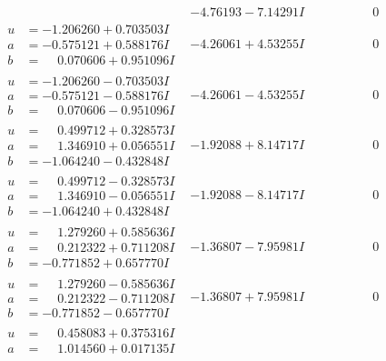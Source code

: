 \documentclass[1p]{elsarticle_modified}
\theoremstyle{definition}
\begin{document}
$$\begin{array}{c|c|c}
 & -4.76193 - 7.14291 I & \phantom{-0.000000 } 0 \\ \hline\begin{aligned}
u &= -1.206260 + 0.703503 I \\
a &= -0.575121 + 0.588176 I \\
b &= \phantom{-}0.070606 + 0.951096 I\end{aligned}
 & -4.26061 + 4.53255 I & \phantom{-0.000000 } 0 \\ \hline\begin{aligned}
u &= -1.206260 - 0.703503 I \\
a &= -0.575121 - 0.588176 I \\
b &= \phantom{-}0.070606 - 0.951096 I\end{aligned}
 & -4.26061 - 4.53255 I & \phantom{-0.000000 } 0 \\ \hline\begin{aligned}
u &= \phantom{-}0.499712 + 0.328573 I \\
a &= \phantom{-}1.346910 + 0.056551 I \\
b &= -1.064240 - 0.432848 I\end{aligned}
 & -1.92088 + 8.14717 I & \phantom{-0.000000 } 0 \\ \hline\begin{aligned}
u &= \phantom{-}0.499712 - 0.328573 I \\
a &= \phantom{-}1.346910 - 0.056551 I \\
b &= -1.064240 + 0.432848 I\end{aligned}
 & -1.92088 - 8.14717 I & \phantom{-0.000000 } 0 \\ \hline\begin{aligned}
u &= \phantom{-}1.279260 + 0.585636 I \\
a &= \phantom{-}0.212322 + 0.711208 I \\
b &= -0.771852 + 0.657770 I\end{aligned}
 & -1.36807 - 7.95981 I & \phantom{-0.000000 } 0 \\ \hline\begin{aligned}
u &= \phantom{-}1.279260 - 0.585636 I \\
a &= \phantom{-}0.212322 - 0.711208 I \\
b &= -0.771852 - 0.657770 I\end{aligned}
 & -1.36807 + 7.95981 I & \phantom{-0.000000 } 0 \\ \hline\begin{aligned}
u &= \phantom{-}0.458083 + 0.375316 I \\
a &= \phantom{-}1.014560 + 0.017135 I \\

\end{aligned}
\end{array}$$
\end{document}
